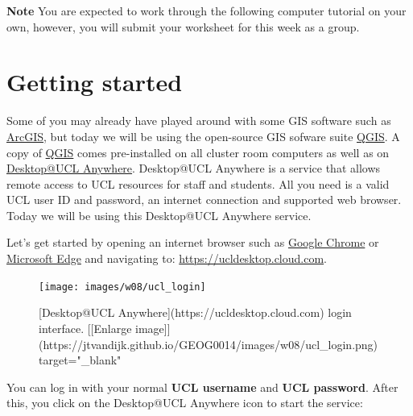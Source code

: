 \documentclass[
]{book}
\begin{document}
\textbf{Note}
You are expected to work through the following computer tutorial on your own, however, you will submit your worksheet for this week as a group.

\hypertarget{getting-started}{%
\section*{Getting started}\label{getting-started}}

Some of you may already have played around with some GIS software such as \href{https://www.arcgis.com/index.html}{ArcGIS}, but today we will be using the open-source GIS sofware suite \href{https://www.qgis.org/en/site/}{QGIS}. A copy of \href{https://www.qgis.org/en/site/}{QGIS} comes pre-installed on all cluster room computers as well as on \href{https://www.ucl.ac.uk/isd/services/computers/remote-access/desktopucl-anywhere}{Desktop@UCL Anywhere}. Desktop@UCL Anywhere is a service that allows remote access to UCL resources for staff and students. All you need is a valid UCL user ID and password, an internet connection and supported web browser. Today we will be using this Desktop@UCL Anywhere service.

Let's get started by opening an internet browser such as \href{https://www.google.co.uk/chrome/?brand=FHFK\&gclid=Cj0KCQiAip-PBhDVARIsAPP2xc26lB3ONziz2KnCd7Ac1MVjTx66n0Ull4R8oiQqzXzgKnJSqRCwK60aAhmFEALw_wcB\&gclsrc=aw.ds}{Google Chrome} or \href{https://www.microsoft.com/en-us/edge}{Microsoft Edge} and navigating to: \url{https://ucldesktop.cloud.com}.

\begin{figure}

{\centering \texttt{[image: images/w08/ucl\_login]} 

}

\caption{[Desktop@UCL Anywhere](https://ucldesktop.cloud.com) login interface. [[Enlarge image]](https://jtvandijk.github.io/GEOG0014/images/w08/ucl_login.png){target="_blank"}}\label{fig:ucl-desktop-login}
\end{figure}

You can log in with your normal \textbf{UCL username} and \textbf{UCL password}. After this, you click on the Desktop@UCL Anywhere icon to start the service:
\end{document}
